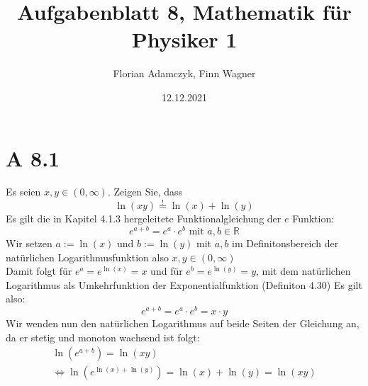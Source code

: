 \documentclass{article}
\date{12.12.2021}
\title{Aufgabenblatt 8, Mathematik für Physiker 1}
\author{Florian Adamczyk, Finn Wagner}
\newcommand{\proofeq}{\overset{!}{=}}
\begin{document}
    \maketitle

    \section*{A 8.1}
    Es seien \(x,y \in (0,\infty)\). Zeigen Sie, dass
    \[ \ln(xy) \proofeq \ln(x) + \ln(y) \]
    Es gilt die in Kapitel 4.1.3 hergeleitete Funktionalgleichung der \(e\) Funktion:
    \[ e^{a+b} = e^a \cdot e^b \text{ mit } a,b \in \mathbb{R} \]
    Wir setzen \(a := \ln(x) \) und \(b := \ln(y) \) mit \(a,b\) im Definitonsbereich der natürlichen Logarithmusfunktion also \(x,y \in (0, \infty ) \) \\
    Damit folgt für \(e^a = e^{\ln(x)} = x\) und für \(e^b = e^{\ln(y)} = y\), mit dem natürlichen Logarithmus als Umkehrfunktion der Exponentialfunktion (Definiton 4.30)
    Es gilt also:
    \[e^{a+b} = e^a \cdot e^b = x \cdot y \]
    Wir wenden nun den natürlichen Logarithmus auf beide Seiten der Gleichung an, da er stetig und monoton wachsend ist folgt:
    \begin{gather*}
        \ln(e^{a+b}) = \ln(xy) \\
        \Leftrightarrow \ln(e^{\ln(x) + \ln(y)}) = \ln(x) + \ln(y) = \ln(xy)
    \end{gather*}
    
\end{document}
